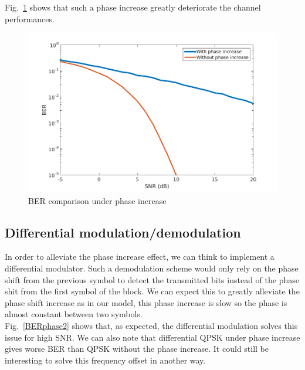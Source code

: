 \documentclass[a4paper,12pt]{article}
\begin{document}
Fig.~\ref{BERphase} shows that such a phase increase greatly deteriorate the channel performances.

\begin{figure}[ht!]
\centering
\begin{center}
\includegraphics[scale=0.50]{BER_phase_increase.png}
\caption{BER comparison under phase increase}
\label{BERphase}
\end{center}
\end{figure}

\subsection{Differential modulation/demodulation}
In order to alleviate the phase increase effect, we can think to implement a differential modulator. Such a demodulation scheme would only rely on the phase shift from the previous symbol to detect the transmitted bits instead of the phase shit from the first symbol of the block. We can expect this to greatly alleviate the phase shift increase as in our model, this phase increase is slow so the phase is almost constant between two symbols.\\
Fig.~\ref{BERphase2} shows that, as expected, the differential modulation solves this issue for high SNR. We can also note that differential QPSK under phase increase gives worse BER than QPSK without the phase increase. It could still be interesting to solve this frequency offset in another way.
\end{document}
